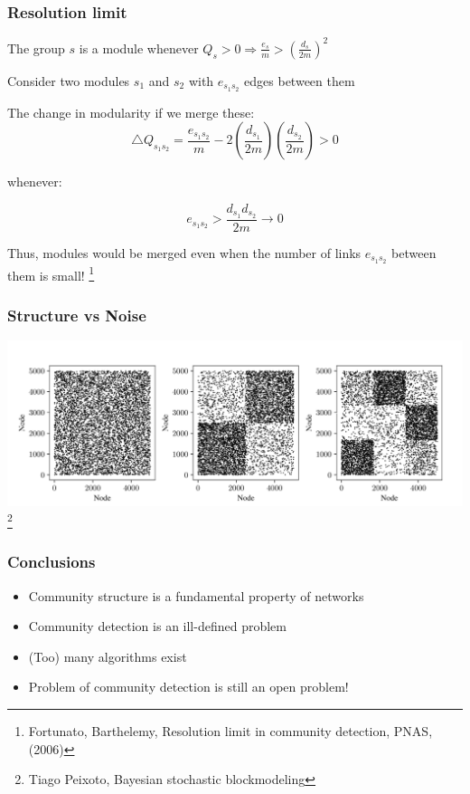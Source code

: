 \documentclass{beamer}
\begin{document}
\begin{frame}
    \frametitle{Resolution limit}
    The group $s$ is a module whenever $Q_s > 0 \Rightarrow \frac{e_s}{m}>\left(\frac{d_s}{2m}\right)^2$

    \vspace{2em} 
    \justifying
    Consider two modules $s_1$ and $s_2$ with $e_{s_1s_2}$ edges between them

    The change in modularity if we merge these:
    $$\triangle Q_{s_1s_2} = \frac{e_{s_1s_2}}{m}-2\left(\frac{d_{s_1}}{2m}\right)\left(\frac{d_{s_2}}{2m}\right)>0$$

    whenever:

    $$e_{s_1s_2} > \frac{d_{s_1}d_{s_2}}{2m}\rightarrow 0$$

    Thus, modules would be merged even when the number of links $e_{s_1s_2}$ between them is small!
\footnote{Fortunato, Barthelemy, Resolution limit in community detection, PNAS, (2006)}
\end{frame}
\begin{frame}
    \frametitle{Structure vs Noise}
    \centering
    \includegraphics[width=\columnwidth]{three_adjacency.png}
\footnote{Tiago Peixoto, Bayesian stochastic blockmodeling}
\end{frame}
\begin{frame}
    \frametitle{Conclusions}
    \centering
    \begin{itemize}
    \setlength\itemsep{1em}
        \item{Community structure is a fundamental property of networks}
        \item{Community detection is an ill-defined problem}
        \item{(Too) many algorithms exist}
        \item{Problem of community detection is still an open problem!}
    \end{itemize}
\end{frame}
\end{document}
